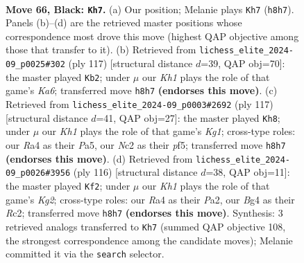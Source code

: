 \documentclass[11pt]{article}
\begin{document}
\begin{figure}[p]\centering
\begin{subfigure}{0.46\textwidth}\centering
\resizebox{\linewidth}{!}{%
\newchessgame
\chessboard[
  setfen={1R5k/8/7r/8/r5bB/6R1/2n2P2/7K b - - 12 66},
  showmover=false,
  pgfstyle=straightmove, color=movearrow, markmove={h8-h7}
]}
\caption{}
\end{subfigure}\hfill
\begin{subfigure}{0.46\textwidth}\centering
\resizebox{\linewidth}{!}{%
\newchessgame
\chessboard[
  setfen={R7/8/8/4K3/4B3/k4r2/8/4r3 b - - 5 59},
  showmover=false,
  pgfstyle=straightmove, color=movearrow, markmove={a3-b2}
]}
\caption{}
\end{subfigure}
\\[4pt]
\begin{subfigure}{0.46\textwidth}\centering
\resizebox{\linewidth}{!}{%
\newchessgame
\chessboard[
  setfen={3r2k1/2R5/6R1/p4Pp1/3P4/4P3/6K1/rb6 b - - 1 59},
  showmover=false,
  pgfstyle=straightmove, color=movearrow, markmove={g8-h8}
]}
\caption{}
\end{subfigure}\hfill
\begin{subfigure}{0.46\textwidth}\centering
\resizebox{\linewidth}{!}{%
\newchessgame
\chessboard[
  setfen={8/2k5/8/p1p3r1/4R1B1/8/P1R3K1/1r6 w - - 0 59},
  showmover=false,
  pgfstyle=straightmove, color=movearrow, markmove={g2-f2}
]}
\caption{}
\end{subfigure}
\caption{\textbf{Move 66, Black: \texttt{Kh7}.} (a) Our position; Melanie plays \texttt{Kh7} (\texttt{h8h7}). Panels (b)--(d) are the retrieved master positions whose correspondence most drove this move (highest QAP objective among those that transfer to it). (b) Retrieved from \texttt{lichess\_elite\_2024-09\_p0025\#302} (ply 117) [structural distance $d$=39, QAP obj=70]: the master played \texttt{Kb2}; under $\mu$ our \emph{Kh1} plays the role of that game's \emph{Ka6}; transferred move \texttt{h8h7} \textbf{(endorses this move)}. (c) Retrieved from \texttt{lichess\_elite\_2024-09\_p0003\#2692} (ply 117) [structural distance $d$=41, QAP obj=27]: the master played \texttt{Kh8}; under $\mu$ our \emph{Kh1} plays the role of that game's \emph{Kg1}; cross-type roles: our \emph{R}a4 as their \emph{P}a5, our \emph{N}c2 as their \emph{p}f5; transferred move \texttt{h8h7} \textbf{(endorses this move)}. (d) Retrieved from \texttt{lichess\_elite\_2024-09\_p0026\#3956} (ply 116) [structural distance $d$=38, QAP obj=11]: the master played \texttt{Kf2}; under $\mu$ our \emph{Kh1} plays the role of that game's \emph{Kg2}; cross-type roles: our \emph{R}a4 as their \emph{P}a2, our \emph{B}g4 as their \emph{R}c2; transferred move \texttt{h8h7} \textbf{(endorses this move)}. Synthesis: 3 retrieved analogs transferred to \texttt{Kh7} (summed QAP objective 108, the strongest correspondence among the candidate moves); Melanie committed it via the \texttt{search} selector.}
\label{fig:thought-m131}
\end{figure}
\end{document}
